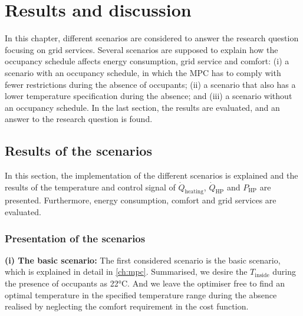\chapter{Results and discussion}
\label{ch:results}
In this chapter, different scenarios are considered to answer the research question focusing on grid services. Several scenarios are supposed to explain how the occupancy schedule affects energy consumption, grid service and comfort: (i) a scenario with an occupancy schedule, in which the MPC has to comply with fewer restrictions during the absence of occupants; (ii) a scenario that also has a lower temperature specification during the absence; and (iii) a scenario without an occupancy schedule. In the last section, the results are evaluated, and an answer to the research question is found.

\section{Results of the scenarios}
\label{sec:ResultsScenarios}
In this section, the implementation of the different scenarios is explained and the results of the temperature and control signal of $\dot{Q}_\text{heating}$, $\dot{Q}_\text{HP}$ and $P_\text{HP}$ are presented. Furthermore, energy consumption, comfort and grid services are evaluated.  

\subsection{Presentation of the scenarios}
\label{subsec:Presentation of the scenarios}

\textbf{(i) The basic scenario:}\newline
The first considered scenario is the basic scenario, which is explained in detail in \autoref{ch:mpc}. Summarised, we desire the $T_\text{inside}$ during the presence of occupants as 22°C. And we leave the optimiser free to find an optimal temperature in the specified temperature range during the absence realised by neglecting the comfort requirement in the cost function.\newline

